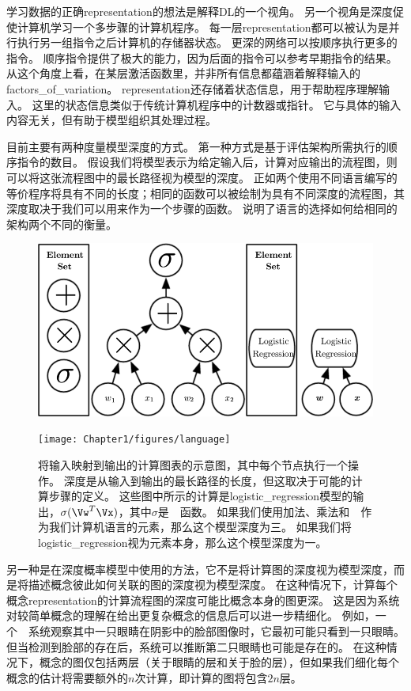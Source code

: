 学习数据的正确\gls{representation}的想法是解释\gls{DL}的一个视角。
另一个视角是深度促使计算机学习一个多步骤的计算机程序。
每一层\gls{representation}都可以被认为是并行执行另一组指令之后计算机的存储器状态。
更深的网络可以按顺序执行更多的指令。
顺序指令提供了极大的能力，因为后面的指令可以参考早期指令的结果。
从这个角度上看，在某层激活函数里，并非所有信息都蕴涵着解释输入的\gls{factors_of_variation}。
\gls{representation}还存储着状态信息，用于帮助程序理解输入。
这里的状态信息类似于传统计算机程序中的计数器或指针。
它与具体的输入内容无关，但有助于模型组织其处理过程。


目前主要有两种度量模型深度的方式。
第一种方式是基于评估架构所需执行的顺序指令的数目。
假设我们将模型表示为给定输入后，计算对应输出的流程图，则可以将这张流程图中的最长路径视为模型的深度。
正如两个使用不同语言编写的等价程序将具有不同的长度；相同的函数可以被绘制为具有不同深度的流程图，其深度取决于我们可以用来作为一个步骤的函数。
说明了语言的选择如何给相同的架构两个不同的衡量。

\begin{figure}[!htb]
\ifOpenSource
\centerline{\includegraphics[scale=0.5]{images/3.png}}
\else
\centerline{\texttt{[image: Chapter1/figures/language]}}
\fi
\caption{将输入映射到输出的计算图表的示意图，其中每个节点执行一个操作。
深度是从输入到输出的最长路径的长度，但这取决于可能的计算步骤的定义。
这些图中所示的计算是\gls{logistic_regression}模型的输出，$\sigma(\Vw^T \Vx)$，其中$\sigma$是~~函数。
如果我们使用加法、乘法和~~作为我们计算机语言的元素，那么这个模型深度为三。
如果我们将\gls{logistic_regression}视为元素本身，那么这个模型深度为一。
}
\label{fig:chap1_language}
\end{figure}

另一种是在深度概率模型中使用的方法，它不是将计算图的深度视为模型深度，而是将描述概念彼此如何关联的图的深度视为模型深度。
在这种情况下，计算每个概念\gls{representation}的计算流程图的深度可能比概念本身的图更深。
这是因为系统对较简单概念的理解在给出更复杂概念的信息后可以进一步精细化。
例如，一个~~系统观察其中一只眼睛在阴影中的脸部图像时，它最初可能只看到一只眼睛。
但当检测到脸部的存在后，系统可以推断第二只眼睛也可能是存在的。
在这种情况下，概念的图仅包括两层（关于眼睛的层和关于脸的层），但如果我们细化每个概念的估计将需要额外的$n$次计算，即计算的图将包含$2n$层。

